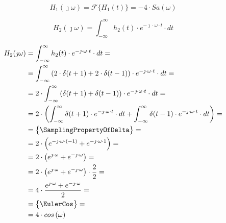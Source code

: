 \begin{task}

\begin{equation}
H_{1}(\jmath \omega) = \mathcal F\{H_{1}(t)\} = -4 \cdot Sa\left(\omega\right)
\end{equation}


\begin{equation}
H_2(\jmath \omega )=\int_{-\infty }^{\infty}h_2(t) \cdot e^{-\jmath \cdot \omega \cdot t}\cdot dt
\end{equation}

\begin{align*}
H_2(\jmath \omega )&=\int_{-\infty }^{\infty}h_2(t) \cdot e^{-\jmath \cdot \omega \cdot t}\cdot dt=\\
&=\int_{-\infty }^{\infty}\left( 2 \cdot \delta(t+1) + 2 \cdot \delta(t-1)\right) \cdot e^{-\jmath \cdot \omega \cdot t}\cdot dt=\\
&=2 \cdot \int_{-\infty }^{\infty} \left( \delta(t+1) + \delta(t-1) \right) \cdot e^{-\jmath \cdot \omega \cdot t}\cdot dt=\\
&=2 \cdot \left( \int_{-\infty }^{\infty} \delta(t+1) \cdot e^{-\jmath \cdot \omega \cdot t}\cdot dt + \int_{-\infty }^{\infty} \delta(t-1) \cdot e^{-\jmath \cdot \omega \cdot t}\cdot dt \right)=\\
&=\begin{Bmatrix}
\SamplingPropertyOfDelta
\end{Bmatrix}=\\
&= 2 \cdot \left( e^{-\jmath \cdot \omega \cdot (-1)} + e^{-\jmath \cdot \omega \cdot 1} \right)=\\
&= 2 \cdot \left( e^{\jmath \cdot \omega} + e^{-\jmath \cdot \omega} \right)=\\
&= 2 \cdot \left( e^{\jmath \cdot \omega} + e^{-\jmath \cdot \omega} \right) \cdot \frac{2}{2}=\\
&= 4 \cdot \frac{ e^{\jmath \cdot \omega} + e^{-\jmath \cdot \omega} }{2} =\\
&=\begin{Bmatrix}
\EulerCos
\end{Bmatrix}=\\
&= 4 \cdot cos\left( \omega\right) 
\end{align*}


\end{task}
